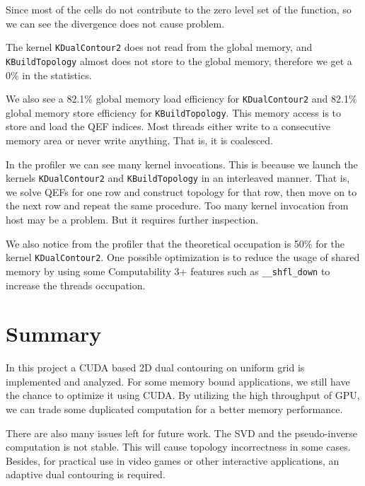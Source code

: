 \documentclass[a4paper,12pt]{article}
\begin{document}
Since most of the cells do not contribute to the zero level set
of the function, so we can see the divergence does not cause problem.

The kernel \texttt{KDualContour2} does not read from the global memory,
and \texttt{KBuildTopology} almost does not store to the global memory,
therefore we get a 0\% in the statistics.

We also see a 82.1\% global memory load efficiency
for \texttt{KDualContour2} and 82.1\% global memory store efficiency for
\texttt{KBuildTopology}.
This memory access is to store and load the QEF indices.
Most threads either write to a consecutive memory area or never write anything.
That is, it is coalesced.

In the profiler we can see many kernel invocations.
This is because we launch the kernels \texttt{KDualContour2} and
\texttt{KBuildTopology}
in an interleaved manner.
That is, we solve QEFs for one row and construct topology for that row,
then move on to the next row and repeat the same procedure.
Too many kernel invocation from host may be a problem.
But it requires further inspection.

We also notice from the profiler that the theoretical occupation is 50\%
for the kernel \texttt{KDualContour2}.
One possible optimization is to reduce the usage of shared memory
by using some Computability 3+ features such as \texttt{\_\_shfl\_down}
to increase the threads occupation.

\section{Summary}

In this project a CUDA based 2D dual contouring on uniform grid
is implemented and analyzed.
For some memory bound applications,
we still have the chance to optimize it using CUDA.
By utilizing the high throughput of GPU,
we can trade some duplicated computation for a better memory performance.

There are also many issues left for future work.
The SVD and the pseudo-inverse computation is not stable.
This will cause topology incorrectness in some cases.
Besides, for practical use in video games or other interactive applications,
an adaptive dual contouring is required.

\newpage
{}


\end{document}
